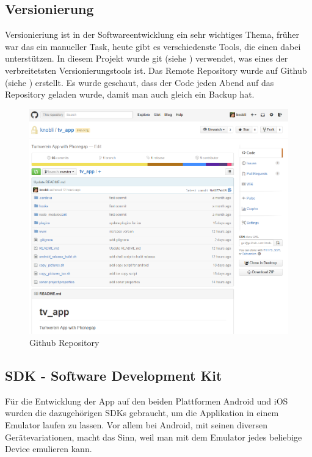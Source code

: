 \subsection{Versionierung}
Versionieriung ist in der Softwareentwicklung ein sehr wichtiges Thema, früher war das ein manueller Task, heute gibt es verschiedenste Tools, die einen dabei unterstützen. In diesem Projekt wurde git (siehe \cite{git}) verwendet, was eines der verbreitetsten Versionierungstools ist. Das Remote Repository wurde auf Github (siehe \cite{github_app}) erstellt. Es wurde geschaut, dass der Code jeden Abend auf das Repository geladen wurde, damit man auch gleich ein Backup hat.

\begin{figure}[h]
\centering
\includegraphics[scale=0.5]{images/github.png}
\caption{Github Repository}
\label{fig:github_repo}
\end{figure}

\newpage
\subsection{SDK - Software Development Kit}
Für die Entwicklung der App auf den beiden Plattformen Android und iOS wurden die dazugehörigen SDKs gebraucht, um die Applikation in einem Emulator laufen zu lassen. Vor allem bei Android, mit seinen diversen Gerätevariationen, macht das Sinn, weil man mit dem Emulator jedes beliebige Device emulieren kann.

